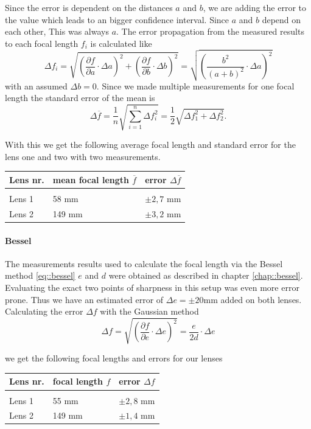 Since the error is dependent on the distances $a$ and $b$, we are adding the error to the value which leads to an bigger confidence interval.
Since $a$ and $b$ depend on each other, 
This was always $a$.
The error propagation from the measured results to each focal length $f_i$ is calculated like
\[
  \displaystyle	\Delta f_i = \sqrt{\left(\frac{\partial f}{\partial a} \cdot \Delta a \right)^2 +\left(\frac{\partial f}{\partial b} \cdot \Delta b\right)^2 } = \sqrt{\left(\frac{b^2}{(a+b)^2}\cdot \Delta a\right)^2}
\]
with an assumed $\Delta b = 0$. 
Since we made multiple measurements for one focal length the standard error of the mean is
\[
\displaystyle	\Delta \overline{f} =\frac{1}{n} \sqrt{\sum_{i=1}^{n}\Delta f_i^2} = \frac{1}{2}\sqrt{\Delta f_1^2 + \Delta f_2^2 }.
\label{eq::mean}
\]

With this we get the following average focal length and standard error for the lens one and two with two measurements.

	\begin{tabularx}{\textwidth}{XM{5cm}M{5cm}}%
		\toprule 
		Lens nr.& mean focal length $\overline{f}$ & error $\Delta \overline{f}$\\
		\hline
		&&\\[-5pt]
		Lens 1	& 58 \si{\milli \m} & $\pm 2,7$ \si{\milli \m}	\\
		Lens 2	& 149 \si{\milli \m} & $\pm 3,2$ \si{\milli \m}	\\
		

		\bottomrule 
	\end{tabularx}

\paragraph{Bessel}
The measurements results used to calculate the focal length via the Bessel method \ref{eq::bessel} $e$ and $d$ were obtained as described in chapter \ref{chap::bessel}.
Evaluating the exact two points of sharpness in this setup was even more error prone.
Thus we have an estimated error of $\Delta e= \pm 20$\si{\milli\m} added on both lenses.
Calculating the error $\Delta f$ with the Gaussian method
\[
\displaystyle	\Delta f = \sqrt{\left(\frac{\partial f}{\partial e} \cdot \Delta e \right)^2 } = \frac{e}{2d}\cdot \Delta e
\]

we get the following focal lengths and errors for our lenses

\begin{tabularx}{\textwidth}{XM{5cm}M{5cm}}%
	\toprule 
	Lens nr.&focal length $f$ & error $\Delta f$\\
	\hline
	&&\\[-5pt]
	Lens 1	& 55 \si{\milli \m} & $\pm 2,8$ \si{\milli \m}	\\
	Lens 2	& 149 \si{\milli \m} & $\pm 1,4$ \si{\milli \m}	\\	
	\bottomrule 
\end{tabularx}

